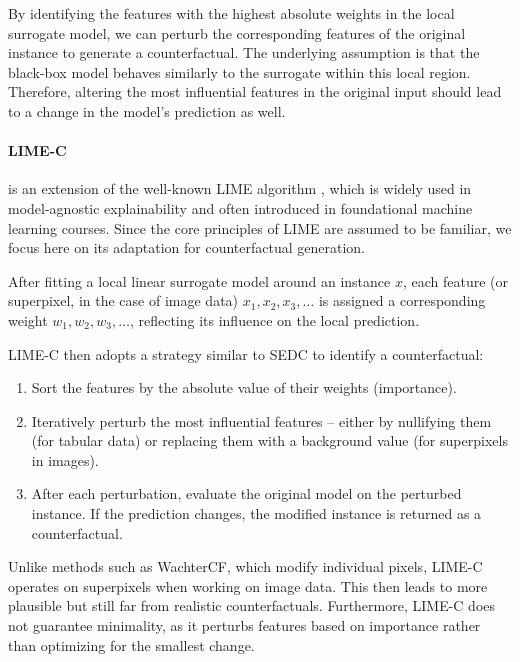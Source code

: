 By identifying the features with the highest absolute weights in the local surrogate model,
we can perturb the corresponding features of the original instance to generate a counterfactual.
The underlying assumption is that the black-box model behaves similarly to the surrogate within this local region. Therefore, altering the most influential features in the original input should lead to a change in the model’s prediction as well.

\begin{methodparagraph}
    \paragraph{LIME-C} \cite{ramon2020comparison} is an extension of the well-known LIME algorithm \cite{ribeiro2016should},
    which is widely used in model-agnostic explainability and often introduced in foundational machine learning courses.
    Since the core principles of LIME are assumed to be familiar,
    we focus here on its adaptation for counterfactual generation.

    After fitting a local linear surrogate model around an instance \( x \),
    each feature (or superpixel, in the case of image data) \( x_1, x_2, x_3, \dots \)
    is assigned a corresponding weight \( w_1, w_2, w_3, \dots \),
    reflecting its influence on the local prediction.

    LIME-C then adopts a strategy similar to SEDC \cite{martens2014explaining} to identify a counterfactual:
    \begin{enumerate}
        \item Sort the features by the absolute value of their weights (importance).
        \item Iteratively perturb the most influential features -- either by nullifying them (for tabular data) or replacing them with a background value (for superpixels in images).
        \item After each perturbation, evaluate the original model on the perturbed instance.
              If the prediction changes, the modified instance is returned as a counterfactual.
    \end{enumerate}
\end{methodparagraph}

Unlike methods such as WachterCF, which modify individual pixels, LIME-C operates on superpixels when working on image data.
This then leads to more plausible but still far from realistic counterfactuals.
Furthermore, LIME-C does not guarantee minimality, as it perturbs features based on importance rather than optimizing for the smallest change.

